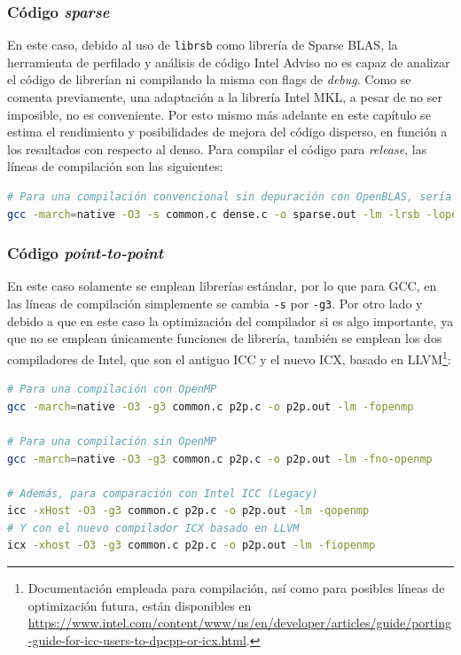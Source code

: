 \subsubsection{Código \textit{sparse}}
En este caso, debido al uso de \texttt{librsb} como librería de Sparse BLAS, la herramienta de perfilado y análisis de código Intel Adviso no es capaz de analizar el código de librerían ni compilando la misma con flags de \textit{debug}. Como se comenta previamente, una adaptación a la librería Intel MKL, a pesar de no ser imposible, no es conveniente. Por esto mismo más adelante en este capítulo se estima el rendimiento y posibilidades de mejora del código disperso, en función a los resultados con respecto al denso. Para compilar el código para \textit{release}, las líneas de compilación son las siguientes:\medskip
\begin{lstlisting}[language=bash]
# Para una compilación convencional sin depuración con OpenBLAS, sería necesario únicamente ejecutar
gcc -march=native -O3 -s common.c dense.c -o sparse.out -lm -lrsb -lopenblas
\end{lstlisting}

\subsubsection{Código \textit{point-to-point}}
En este caso solamente se emplean librerías estándar, por lo que para GCC, en las líneas de compilación simplemente se cambia \texttt{-s} por \texttt{-g3}. Por otro lado y debido a que en este caso la optimización del compilador si es algo importante, ya que no se emplean únicamente funciones de librería, también se emplean los dos compiladores de Intel, que son el antiguo ICC y el nuevo ICX, basado en LLVM\footnote{Documentación empleada para compilación, así como para posibles líneas de optimización futura, están disponibles en \url{https://www.intel.com/content/www/us/en/developer/articles/guide/porting-guide-for-icc-users-to-dpcpp-or-icx.html}.}:\medskip
\begin{lstlisting}[language=bash]
# Para una compilación con OpenMP
gcc -march=native -O3 -g3 common.c p2p.c -o p2p.out -lm -fopenmp

# Para una compilación sin OpenMP
gcc -march=native -O3 -g3 common.c p2p.c -o p2p.out -lm -fno-openmp

# Además, para comparación con Intel ICC (Legacy)
icc -xHost -O3 -g3 common.c p2p.c -o p2p.out -lm -qopenmp
# Y con el nuevo compilador ICX basado en LLVM
icx -xhost -O3 -g3 common.c p2p.c -o p2p.out -lm -fiopenmp
\end{lstlisting}

